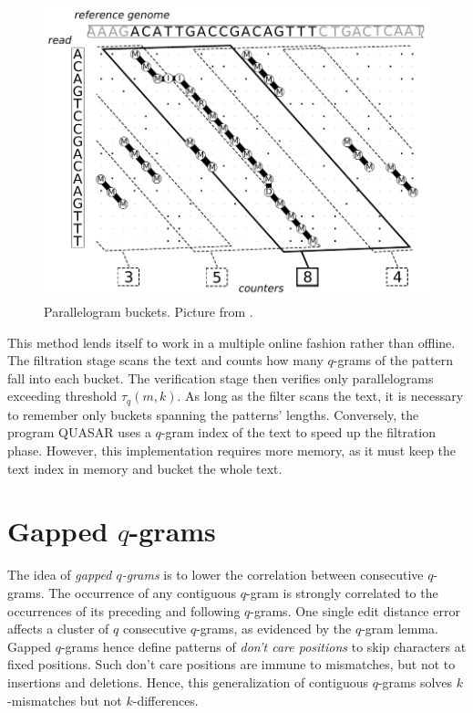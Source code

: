 \begin{figure}[h]
\begin{center}
\caption[Parallelogram buckets] {Parallelogram buckets. Picture from \citep{Weese2009}.}
\label{fig:swift}
\includegraphics[scale=0.75]{figures/swift.pdf}
\end{center}
\end{figure}

This method lends itself to work in a multiple online fashion rather than offline.
The filtration stage scans the text and counts how many $q$-grams of the pattern fall into each bucket.
The verification stage then verifies only parallelograms exceeding threshold $\tau_q(m,k)$.
As long as the filter scans the text, it is necessary to remember only buckets spanning the patterns' lengths.
Conversely, the program QUASAR \citep{Burkhardt1999} uses a $q$-gram index of the text to speed up the filtration phase.
However, this implementation requires more memory, as it must keep the text index in memory and bucket the whole text.


\section{Gapped $q$-grams}
\label{sec:filtering:qgrams-gapped}

The idea of \emph{gapped $q$-grams} is to lower the correlation between consecutive $q$-grams.
The occurrence of any contiguous $q$-gram is strongly correlated to the occurrences of its preceding and following $q$-grams.
One single edit distance error affects a cluster of $q$ consecutive $q$-grams, as evidenced by the $q$-gram lemma.
Gapped $q$-grams hence define patterns of \emph{don't care positions} to skip characters at fixed positions.
Such don't care positions are immune to mismatches, but not to insertions and deletions.
Hence, this generalization of contiguous $q$-grams solves $k$-mismatches but not $k$-differences.


